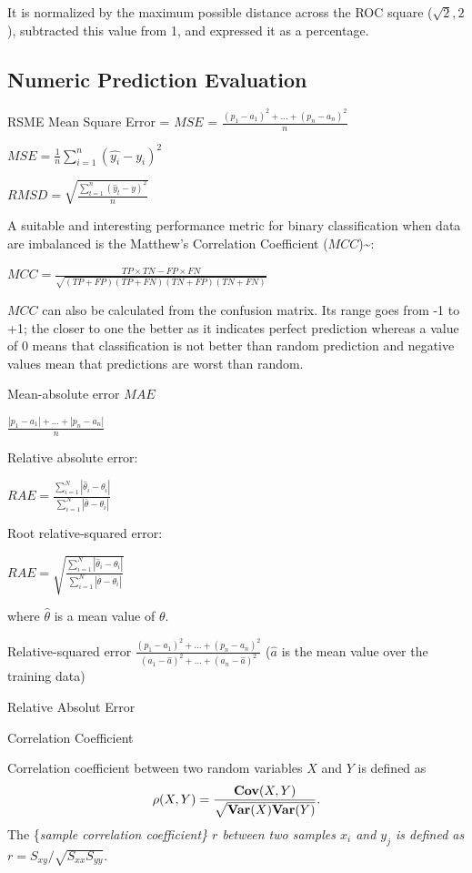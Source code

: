 \documentclass[]{book}
\theoremstyle{definition}
\theoremstyle{definition}
\theoremstyle{remark}
\begin{document}
{It is normalized by the maximum possible distance across the ROC square
(\(\sqrt{2}, 2\)), subtracted this value from 1, and expressed it as a
percentage.

\subsection{Numeric Prediction
Evaluation}\label{numeric-prediction-evaluation}

RSME Mean Square Error = \(MSE\) =
\(\frac{(p_1-a_1)^2 + \ldots +(p_n-a_n)^2}{n}\)

\({MSE}=\frac{1}{n}\sum_{i=1}^n(\hat{y_i} - y_i)^2\)

\({RMSD}=\sqrt{\frac{\sum_{t=1}^n (\hat y_t - y)^2}{n}}\)

A suitable and interesting performance metric for binary classification
when data are imbalanced is the Matthew's Correlation Coefficient
(\(MCC\))\textasciitilde{}\cite{Matthews1975Comparison}:

\(MCC=\frac{TP\times TN - FP\times FN}{\sqrt{(TP+FP)(TP+FN)(TN+FP)(TN+FN)}}\)

\(MCC\) can also be calculated from the confusion matrix. Its range goes
from -1 to +1; the closer to one the better as it indicates perfect
prediction whereas a value of 0 means that classification is not better
than random prediction and negative values mean that predictions are
worst than random.

Mean-absolute error \(MAE\)

\(\frac{|p_1-a_1| + \ldots +|p_n-a_n|}{n}\)

Relative absolute error:

\(RAE = \frac{ \sum^N_{i=1} | \hat{\theta}_i - \theta_i | } { \sum^N_{i=1} | \overline{\theta} - \theta_i | }\)

Root relative-squared error:

\(RAE = \sqrt{ \frac{ \sum^N_{i=1} | \hat{\theta}_i - \theta_i | } { \sum^N_{i=1} | \overline{\theta} - \theta_i | } }\)

where \(\hat{\theta}\) is a mean value of \(\theta\).

Relative-squared error
\(\frac{(p_1-a_1)^2 + \ldots +(p_n-a_n)^2}{(a_1-\hat{a})^2 + \ldots + (a_n-\hat{a})^2}\)
(\(\hat{a}\) is the mean value over the training data)

Relative Absolut Error

Correlation Coefficient

Correlation coefficient between two random variables \(X\) and \(Y\) is
defined as \[\rho(X,Y) = \frac{{\bf
Cov}(X,Y)}{\sqrt{{\bf Var}(X){\bf Var}(Y)}}.\] The \{\em sample
correlation coefficient\} \(r\) between two samples \(x_i\) and \(y_j\)
is defined as \(r = S_{xy}/\sqrt{S_{xx}S_{yy}}.\)

}
\end{document}
